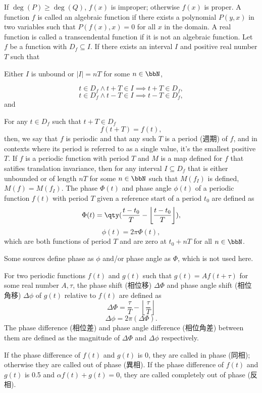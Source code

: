 \documentclass[a4paper,12pt]{article}
\begin{document}
If $\deg(P)\geq\deg(Q)$, $f(x)$ is improper; otherwise $f(x)$ is proper.
A function $f$ is called an algebraic function if there exists a polynomial $P(y,x)$ in two variables such that $P(f(x),x)=0$ for all $x$ in the domain.
A real function is called a transcendental function if it is not an algebraic function.
Let $f$ be a function with $D_f\subseteq I$. If there exists an interval $I$ and positive real number $T$ such that
\bit
\item Either $I$ is unbound or $|I|=nT$ for some $n\in\bbN$,
\item
\[t\in D_f\land t+T\in I\implies t+T\in D_f,\]
\[t\in D_f\land t-T\in I \implies t-T\in D_f,\]
and
\item For any $t\in D_f$ such that $t+T\in D_f$
\[f(t+T)=f(t),\]
\eit
then, we say that $f$ is periodic and that any such $T$ is a period (週期) of $f$, and in contexts where its period is referred to as a single value, it's the smallest positive $T$.
If $f$ is a periodic function with period $T$ and $M$ is a map defined for $f$ that satifies translation invariance, then for any interval $I\subseteq D_f$ that is either unbounded or of length $nT$ for some $n\in\bbN$ such that $M(f_I)$ is defined, $M(f)=M(f_I)$.
The phase $\Phi(t)$ and phase angle $\phi(t)$ of a periodic function $f(t)$ with period $T$ given a reference start of a period $t_0$ are defined as
\[\Phi(t)=\qty(\frac{t-t_0}{T}-\left\lfloor\frac{t-t_0}{T}\right\rfloor),\]
\[\phi(t)=2\pi\Phi(t),\]
which are both functions of period $T$ and are zero at $t_0+nT$ for all $n\in\bbN$.

Some sources define phase as $\phi$ and/or phase angle as $\Phi$, which is not used here.

For two periodic functions $f(t)$ and $g(t)$ such that $g(t)=Af(t+\tau)$ for some real number $A,\tau$, the phase shift (相位移) $\Delta\Phi$ and phase angle shift (相位角移) $\Delta\phi$ of $g(t)$ relative to $f(t)$ are defined as
\[\Delta\Phi=\frac{\tau}{T}-\left\lfloor\frac{\tau}{T}\right\rfloor\]
\[\Delta\phi=2\pi(\Delta\Phi).\]
The phase difference (相位差) and phase angle difference (相位角差) between them are defined as the magnitude of $\Delta\Phi$ and $\Delta\phi$ respectively.

If the phase difference of $f(t)$ and $g(t)$ is 0, they are called in phase (同相); otherwise they are called out of phase (異相). If the phase difference of $f(t)$ and $g(t)$ is 0.5 and $\alpha f(t)+g(t)=0$, they are called completely out of phase (反相).
\end{document}
